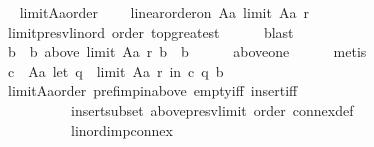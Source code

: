 \begin{isabellebody}
\ \isamarkupfalse%
\ limitAa{\isacharunderscore}{\kern0pt}order{\isacharcolon}{\kern0pt}\isanewline
\ \ \ \ {\isachardoublequoteopen}linear{\isacharunderscore}{\kern0pt}order{\isacharunderscore}{\kern0pt}on\ {\isacharparenleft}{\kern0pt}A{\isacharminus}{\kern0pt}{\isacharbraceleft}{\kern0pt}a{\isacharbraceright}{\kern0pt}{\isacharparenright}{\kern0pt}\ {\isacharparenleft}{\kern0pt}limit\ {\isacharparenleft}{\kern0pt}A{\isacharminus}{\kern0pt}{\isacharbraceleft}{\kern0pt}a{\isacharbraceright}{\kern0pt}{\isacharparenright}{\kern0pt}\ r{\isacharparenright}{\kern0pt}{\isachardoublequoteclose}\isanewline
\ \ \ \ \isamarkupfalse%
\ limit{\isacharunderscore}{\kern0pt}presv{\isacharunderscore}{\kern0pt}lin{\isacharunderscore}{\kern0pt}ord\ order\ top{\isacharunderscore}{\kern0pt}greatest\isanewline
\ \ \ \ \isamarkupfalse%
\ blast\isanewline
\ \ \isamarkupfalse%
\ \isamarkupfalse%
\ b\ \ b{\isacharcolon}{\kern0pt}\ {\isachardoublequoteopen}above\ {\isacharparenleft}{\kern0pt}limit\ {\isacharparenleft}{\kern0pt}A{\isacharminus}{\kern0pt}{\isacharbraceleft}{\kern0pt}a{\isacharbraceright}{\kern0pt}{\isacharparenright}{\kern0pt}\ r{\isacharparenright}{\kern0pt}\ b\ {\isacharequal}{\kern0pt}\ {\isacharbraceleft}{\kern0pt}b{\isacharbraceright}{\kern0pt}{\isachardoublequoteclose}\isanewline
\ \ \ \ \isamarkupfalse%
\ above{\isacharunderscore}{\kern0pt}one\isanewline
\ \ \ \ \isamarkupfalse%
\ metis\isanewline
\ \ \isamarkupfalse%
\ {\isachardoublequoteopen}{\isasymforall}c\ {\isasymin}\ A{\isacharminus}{\kern0pt}{\isacharbraceleft}{\kern0pt}a{\isacharbraceright}{\kern0pt}{\isachardot}{\kern0pt}\ let\ q\ {\isacharequal}{\kern0pt}\ limit\ {\isacharparenleft}{\kern0pt}A{\isacharminus}{\kern0pt}{\isacharbraceleft}{\kern0pt}a{\isacharbraceright}{\kern0pt}{\isacharparenright}{\kern0pt}\ r\ in\ {\isacharparenleft}{\kern0pt}c\ {\isasympreceq}\isactrlsub q\ b{\isacharparenright}{\kern0pt}{\isachardoublequoteclose}\isanewline
\ \ \ \ \isamarkupfalse%
\ limitAa{\isacharunderscore}{\kern0pt}order\ pref{\isacharunderscore}{\kern0pt}imp{\isacharunderscore}{\kern0pt}in{\isacharunderscore}{\kern0pt}above\ empty{\isacharunderscore}{\kern0pt}iff\ insert{\isacharunderscore}{\kern0pt}iff\isanewline
\ \ \ \ \ \ \ \ \ \ insert{\isacharunderscore}{\kern0pt}subset\ above{\isacharunderscore}{\kern0pt}presv{\isacharunderscore}{\kern0pt}limit\ order\ connex{\isacharunderscore}{\kern0pt}def\isanewline
\ \ \ \ \ \ \ \ \ \ lin{\isacharunderscore}{\kern0pt}ord{\isacharunderscore}{\kern0pt}imp{\isacharunderscore}{\kern0pt}connex\isanewline

\end{isabellebody}
